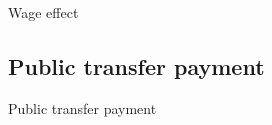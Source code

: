\documentclass[10pt,aspectratio=43,mathserif,table]{beamer}
\begin{document}
\begin{frame}{Wage effect}
	\begin{figure}[thpb]
		\centering
	\end{figure}
\end{frame}



\subsection{Public transfer payment}
\begin{frame}{Public transfer payment}
	\begin{figure}[thpb]
		\centering
	\end{figure}
\end{frame}
\end{document}
